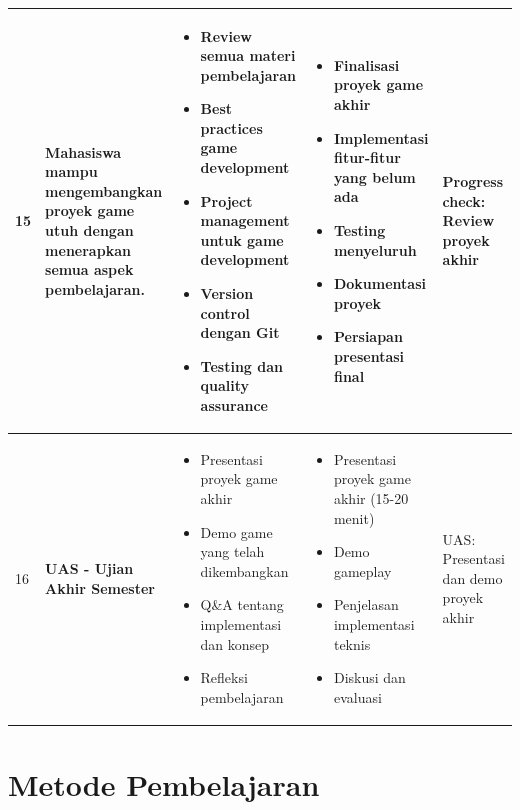 \documentclass[a4paper,12pt]{article}
\begin{document}
\begin{longtable}{|p{0.8cm}|p{3.5cm}|p{4cm}|p{4cm}|p{2.5cm}|}
15 & Mahasiswa mampu mengembangkan proyek game utuh dengan menerapkan semua aspek pembelajaran. & 
\begin{itemize}[leftmargin=*,nosep]
\item Review semua materi pembelajaran
\item Best practices game development
\item Project management untuk game development
\item Version control dengan Git
\item Testing dan quality assurance
\end{itemize} & 
\begin{itemize}[leftmargin=*,nosep]
\item Finalisasi proyek game akhir
\item Implementasi fitur-fitur yang belum ada
\item Testing menyeluruh
\item Dokumentasi proyek
\item Persiapan presentasi final
\end{itemize} & 
Progress check: Review proyek akhir \\
\hline

16 & \textbf{UAS - Ujian Akhir Semester} & 
\begin{itemize}[leftmargin=*,nosep]
\item Presentasi proyek game akhir
\item Demo game yang telah dikembangkan
\item Q\&A tentang implementasi dan konsep
\item Refleksi pembelajaran
\end{itemize} & 
\begin{itemize}[leftmargin=*,nosep]
\item Presentasi proyek game akhir (15-20 menit)
\item Demo gameplay
\item Penjelasan implementasi teknis
\item Diskusi dan evaluasi
\end{itemize} & 
UAS: Presentasi dan demo proyek akhir \\
\hline

\end{longtable}

\section{Metode Pembelajaran}
\end{document}
